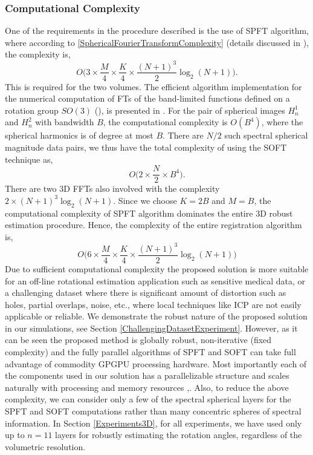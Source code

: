 \documentclass{UCF_ETD}
\begin{document}
\subsubsection{Computational Complexity}
One of the requirements in the procedure described is the use of SPFT algorithm, where according to \eqref{SphericalFourierTransformComplexity} (details discussed in \cite{Alam2015}), the complexity is,
$$O\bigg(3\times \frac{M}{4}\times \frac{K}{4}\times\frac{(N+1)^3}{2}\log_2(N+1)\bigg).$$
This is required for the two volumes. The efficient algorithm implementation for the numerical computation of FTs of the band-limited functions defined on a rotation group $SO(3)$ (\cite{Kostelec2008}), is presented in \cite{Kostelec2015}. For the pair of spherical images $H^1_n$ and $H^2_n$ with bandwidth $B$, the computational complexity is 
$O(B^4)$, where the spherical harmonics is of degree at most $B$. There are $N/2$ such spectral spherical magnitude data pairs, we thus have the total complexity of using the SOFT technique as,
$$O\bigg(2\times\frac{N}{2}\times B^4 \bigg).$$
There are two $3$D FFTs also involved with the complexity  $2 \times (N+1)^3\log_2(N+1).$
Since we choose  $K = 2B$ and $M = B$, the computational complexity of SPFT algorithm dominates the entire $3$D robust estimation procedure. Hence, the complexity of the entire registration algorithm is, 
$$O\bigg(6\times \frac{M}{4}\times \frac{K}{4}\times\frac{(N+1)^3}{2}\log_2(N+1)\bigg)$$
Due to sufficient computational complexity the proposed solution is more suitable for an off-line rotational estimation application such as sensitive medical data, or a challenging dataset where there is significant amount of distortion such as holes, partial overlaps, noise, etc., where local techniques like ICP are not easily applicable or reliable. We demonstrate the robust nature of the proposed solution in our simulations, see Section \ref{ChallengingDatasetExperiment}.
However, as it can be seen the proposed method is globally robust, non-iterative (fixed complexity) and the fully parallel algorithms of SPFT and SOFT can take full advantage of commodity
GPGPU processing hardware. Most importantly each of the components used in our solution has a parallelizable structure and scales naturally with processing and memory
resources \cite{Alam2015},\cite{Kostelec2008}. Also, to reduce the above complexity, we can consider only a few of the spectral spherical layers for the SPFT and SOFT computations rather than many concentric spheres of spectral information. In Section \ref{Experiments3D}, for all experiments, we have used only up to $n = 11$ layers for robustly estimating the rotation angles, regardless of the volumetric resolution. 
\end{document}
